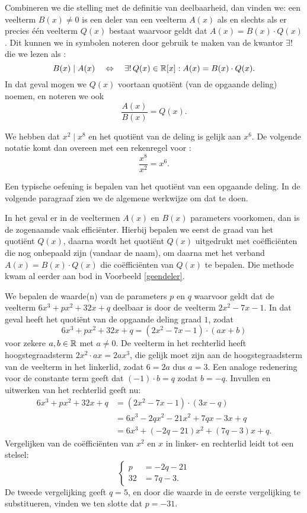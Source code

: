 \documentclass{ximera}
\begin{document}
Combineren we die stelling met de definitie van deelbaarheid, dan vinden we: een veelterm $B(x) \neq 0$ is een deler van een veelterm $A(x)$ als en slechts als er precies \'e\'en veelterm $Q(x)$ bestaat waarvoor geldt dat $A(x) = B(x)\cdot Q(x)$. Dit kunnen we in symbolen noteren door gebruik te maken van de kwantor $\exists!$ die we lezen als :
\[
B(x) \mid A(x) \quad \Leftrightarrow \quad \exists! \, Q(x) \in \mathbb{R}[x]: A(x) = B(x)\cdot Q(x).
\] 
In dat geval mogen we $Q(x)$ voortaan  quoti\"ent (van de opgaande deling) noemen, en noteren we ook 
\[
\frac{A(x)}{B(x)} = Q(x).
\]

\begin{example}
We hebben dat $x^2 \mid x^8$ en het quoti\"ent van de deling is gelijk aan $x^6$. De volgende notatie komt dan overeen met een rekenregel voor :
\[
\frac{x^8}{x^2} = x^6.
\]
\end{example}


Een typische oefening is bepalen van het quoti\"ent van een opgaande deling. In de volgende paragraaf zien we de algemene werkwijze om dat te doen. 

In het geval er in de veeltermen $A(x)$ en $B(x)$ parameters voorkomen, dan is de zogenaamde  vaak effici\"enter. Hierbij bepalen we eerst de graad van het quoti\"ent $Q(x)$, daarna wordt het quoti\"ent $Q(x)$ uitgedrukt met co\"effici\"enten die nog onbepaald zijn (vandaar de naam), om daarna met het verband $A(x) = B(x) \cdot Q(x)$ die co\"effici\"enten van $Q(x)$ te bepalen. Die methode kwam al eerder aan bod in Voorbeeld \ref{geendeler}. 

\begin{example}
We bepalen de waarde(n) van de parameters $p$ en $q$ waarvoor geldt dat de veelterm $6x^3+px^2+32x+q$ deelbaar is door de veelterm $2x^2-7x-1$. In dat geval heeft het quoti\"ent van de opgaande deling graad $1$, zodat 
\[
6x^3+px^2+32x+q = (2x^2-7x-1)\cdot (ax+b)
\]
voor zekere $a,b \in \mathbb{R}$ met $a \neq 0$. De veelterm in het rechterlid heeft hoogstegraadsterm $2x^2 \cdot ax = 2ax^3$, die gelijk moet zijn aan de hoogstegraadsterm van de veelterm in het linkerlid, zodat $6 = 2a$ dus $a = 3$. Een analoge redenering voor de constante term geeft dat $(-1) \cdot b = q$ zodat $b = -q$. Invullen en uitwerken van het rechterlid geeft nu:
\begin{align*}
6x^3+px^2+32x+q 
& = (2x^2-7x-1)\cdot (3x-q) \\
& = 6x^3 - 2qx^2 - 21x^2 + 7qx - 3x + q \\
& = 6x^3 + (-2q-21)x^2 + (7q-3)x+q.
\end{align*}
Vergelijken van de co\"effici\"enten van $x^2$ en $x$ in linker- en rechterlid leidt tot een stelsel:
\[
\left\{ 
\begin{aligned}
p & = -2q - 21 \\
32 & = 7q - 3. 
\end{aligned}
\right.
\]
De tweede vergelijking geeft $q = 5$, en door die waarde in de eerste vergelijking te substitueren, vinden we ten slotte dat $p = -31$.  
\end{example}
\end{document}
